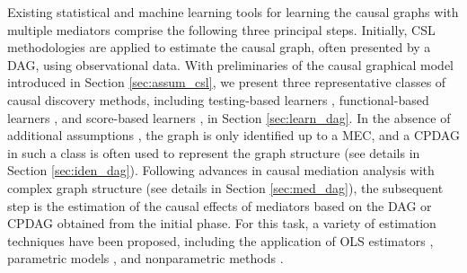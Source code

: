 Existing statistical and machine learning tools for learning the causal graphs with multiple mediators \citep[see e.g.,][]{chakrabortty2018inference,cai2020anoce,shi2021testing} %
comprise the following three principal steps. Initially, \acrshort{CSL} methodologies \citep[see e.g.,][]{spirtes2000constructing,chickering2002optimal,nandy2018high,li2019likelihood,yuan2019constrained,li2023inference} are applied to estimate the causal graph, often presented by a \acrshort{DAG}, using observational data. 
With preliminaries of the causal graphical model \citep{pearl2009causal,peters2014identifiability} introduced in Section \ref{sec:assum_csl}, we present three representative classes of causal discovery methods, including testing-based learners \citep{spirtes2000constructing,kalisch2007estimating}, functional-based learners \citep{shimizu2006linear,buhlmann2014cam}, and score-based learners \citep{zheng2018dags,yu2019dag}, in Section \ref{sec:learn_dag}. In the absence of additional assumptions \citep{shimizu2006linear, neal2020introduction}, the graph is only identified up to a \acrfull{MEC}, and a \acrfull{CPDAG} in such a class is often used to represent the graph structure (see details in Section \ref{sec:iden_dag}). 
Following advances in causal mediation analysis \citep{cai2020anoce} with complex graph structure (see details in Section \ref{sec:med_dag}), 
the subsequent step is the estimation of the causal effects of mediators based on the \acrshort{DAG} or \acrshort{CPDAG} obtained from the initial phase. For this task, a variety of estimation techniques have been proposed, including the application of \acrfull{OLS} estimators \citep{vanderweele2014causal,lin2017interventional,chakrabortty2018inference}, parametric models \citep{vanderweele2014mediation,vanderweele2016causal,chen2023discovery}, and nonparametric methods \citep{an2022opening,brand2023recent}. %

